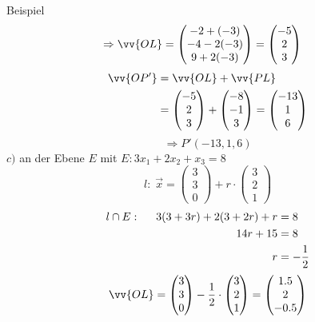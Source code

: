 \documentclass{article}
\begin{document}
\begin{boxx}[DarkBlue]{Beispiel}
\begin{align*}
            \Rightarrow \vv{OL} = \begin{pmatrix}-2+(-3)\\-4-2(-3)\\9+2(-3)\end{pmatrix} &=  \begin{pmatrix}-5\\2\\3\end{pmatrix}
        \end{align*}
        \begin{align*}
            \vv{OP'} &= \vv{OL} + \vv{PL} \\
            &= \begin{pmatrix}-5\\2\\3\end{pmatrix} + \begin{pmatrix}-8\\-1\\3\end{pmatrix} = \begin{pmatrix}-13\\1\\6\end{pmatrix}
        \end{align*}
        \[\Rightarrow P'(-13,1,6)\]
    $c)$\hspace{3mm} an der Ebene $E$ mit $E: 3x_1 + 2x_2 + x_3 = 8$
        \[l:\; \vec{x} = \begin{pmatrix}3\\3\\0\end{pmatrix} + r \cdot \begin{pmatrix}3\\2\\1\end{pmatrix}\]
        \begin{align*}
            l \cap E: \hspace*{5mm} 3(3+3r) + 2(3+2r) + r &= 8 \\
            14r +15 &= 8 \\
            r &= - \frac{1}{2}
        \end{align*}
        \begin{align*}
            \vv{OL}&= \begin{pmatrix}3\\3\\0\end{pmatrix} - \frac{1}{2} \cdot \begin{pmatrix}3\\2\\1\end{pmatrix} = \begin{pmatrix}1.5\\2\\-0.5\end{pmatrix} \\

\end{align*}
\end{boxx}
\end{document}
